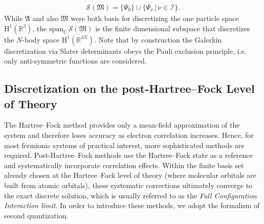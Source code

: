 \documentclass[reqno]{amsart}
\begin{document}
\begin{align}\label{Slater_determinants}
    \mathcal{S}(\mathfrak{M})=\lbrace \Psi_0\rbrace \cup \lbrace \Psi_\nu\,|\, \nu\in \mathscr{I}\rbrace.
\end{align} 
While $\mathfrak{A}$ and also $\mathfrak{M}$ were both basis for discretizing the one particle space $\mathrm{H}^1(\mathbb{R}^3)$, the $\text{span}_\mathbb{C}\, \mathcal{S}(\mathfrak{M})$ is the finite dimensional subspace that discretizes the $N$-body space $\mathrm{H}^1(\mathbb{R}^{3N})$. Note that by construction the Galerkin discretization via Slater determinants obeys the Pauli exclusion principle, i.e. only anti-symmetric functions are considered.

\subsection{Discretization on the post-Hartree–Fock Level of Theory}

The Hartree–Fock method provides only a mean-field approximation of the system and therefore loses accuracy as electron correlation increases. Hence, for most fermionic systems of practical interest, more sophisticated methods are required. Post-Hartree–Fock methods use the Hartree–Fock state as a reference and systematically incorporate correlation effects. Within the finite basis set already chosen at the Hartree–Fock level of theory (where molecular orbitals are built from atomic orbitals), these systematic corrections ultimately converge to the exact discrete solution, which is usually referred to as the \textit{Full Configuration Interaction limit}. In order to introduce these methods, we adopt the formalism of second quantization. 
\end{document}
